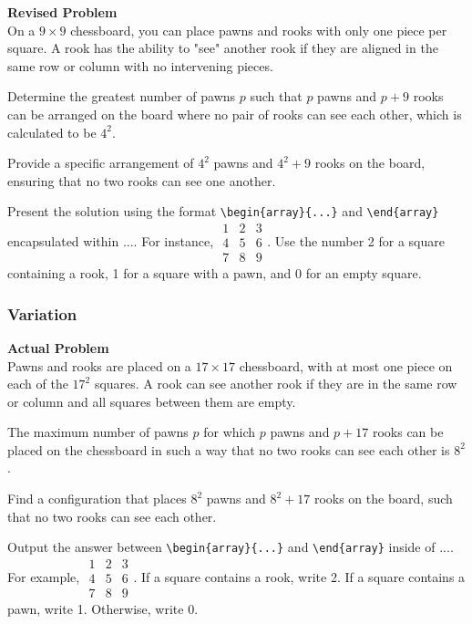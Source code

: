 \textbf{Revised Problem}\\
On a $9 \times 9$ chessboard, you can place pawns and rooks with only one piece per square. A rook has the ability to "see" another rook if they are aligned in the same row or column with no intervening pieces. 

Determine the greatest number of pawns \( p \) such that \( p \) pawns and \( p + 9 \) rooks can be arranged on the board where no pair of rooks can see each other, which is calculated to be \( 4^2 \).

Provide a specific arrangement of \( 4^2 \) pawns and \( 4^2 + 9 \) rooks on the board, ensuring that no two rooks can see one another.

Present the solution using the format \verb|\begin{array}{...}| and \verb|\end{array}| encapsulated within $\boxed{...}$. For instance, $\boxed{\begin{array}{ccc}1 & 2 & 3 \\ 4 & 5 & 6 \\ 7 & 8 & 9\end{array}}$.
Use the number 2 for a square containing a rook, 1 for a square with a pawn, and 0 for an empty square.

\subsubsection{Variation}
\textbf{Actual Problem}\\
Pawns and rooks are placed on a $17 \times 17$ chessboard, with at most one piece on each of the $17^2$ squares. A rook can see another rook if they are in the same row or column and all squares between them are empty. 

The maximum number of pawns $p$ for which $p$ pawns and $p + 17$ rooks can be placed on the chessboard in such a way that no two rooks can see each other is $8^2$. 

Find a configuration that places $8^2$ pawns and $8^2 + 17$ rooks on the board, such that no two rooks can see each other.

Output the answer between \verb|\begin{array}{...}| and \verb|\end{array}| inside of $\boxed{...}$. For example, $\boxed{\begin{array}{ccc}1 & 2 & 3 \\ 4 & 5 & 6 \\ 7 & 8 & 9\end{array}}$.
If a square contains a rook, write 2. If a square contains a pawn, write 1. Otherwise, write 0.

